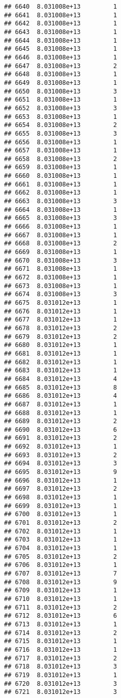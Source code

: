 \documentclass[
]{article}
\begin{document}
\begin{verbatim}
## 6640  8.031008e+13         1
## 6641  8.031008e+13         1
## 6642  8.031008e+13         1
## 6643  8.031008e+13         1
## 6644  8.031008e+13         1
## 6645  8.031008e+13         1
## 6646  8.031008e+13         1
## 6647  8.031008e+13         2
## 6648  8.031008e+13         1
## 6649  8.031008e+13         1
## 6650  8.031008e+13         3
## 6651  8.031008e+13         1
## 6652  8.031008e+13         3
## 6653  8.031008e+13         1
## 6654  8.031008e+13         2
## 6655  8.031008e+13         3
## 6656  8.031008e+13         1
## 6657  8.031008e+13         1
## 6658  8.031008e+13         2
## 6659  8.031008e+13         1
## 6660  8.031008e+13         1
## 6661  8.031008e+13         1
## 6662  8.031008e+13         1
## 6663  8.031008e+13         3
## 6664  8.031008e+13         1
## 6665  8.031008e+13         3
## 6666  8.031008e+13         1
## 6667  8.031008e+13         1
## 6668  8.031008e+13         2
## 6669  8.031008e+13         1
## 6670  8.031008e+13         3
## 6671  8.031008e+13         1
## 6672  8.031008e+13         1
## 6673  8.031008e+13         1
## 6674  8.031008e+13         3
## 6675  8.031012e+13         1
## 6676  8.031012e+13         1
## 6677  8.031012e+13         1
## 6678  8.031012e+13         2
## 6679  8.031012e+13         2
## 6680  8.031012e+13         1
## 6681  8.031012e+13         1
## 6682  8.031012e+13         1
## 6683  8.031012e+13         1
## 6684  8.031012e+13         4
## 6685  8.031012e+13         8
## 6686  8.031012e+13         4
## 6687  8.031012e+13         1
## 6688  8.031012e+13         1
## 6689  8.031012e+13         2
## 6690  8.031012e+13         6
## 6691  8.031012e+13         2
## 6692  8.031012e+13         1
## 6693  8.031012e+13         2
## 6694  8.031012e+13         3
## 6695  8.031012e+13         9
## 6696  8.031012e+13         1
## 6697  8.031012e+13         2
## 6698  8.031012e+13         1
## 6699  8.031012e+13         1
## 6700  8.031012e+13         1
## 6701  8.031012e+13         2
## 6702  8.031012e+13         1
## 6703  8.031012e+13         1
## 6704  8.031012e+13         1
## 6705  8.031012e+13         2
## 6706  8.031012e+13         1
## 6707  8.031012e+13         7
## 6708  8.031012e+13         9
## 6709  8.031012e+13         1
## 6710  8.031012e+13         1
## 6711  8.031012e+13         2
## 6712  8.031012e+13         6
## 6713  8.031012e+13         1
## 6714  8.031012e+13         2
## 6715  8.031012e+13         1
## 6716  8.031012e+13         1
## 6717  8.031012e+13         2
## 6718  8.031012e+13         3
## 6719  8.031012e+13         1
## 6720  8.031012e+13         3
## 6721  8.031012e+13         3

\end{verbatim}
\end{document}
